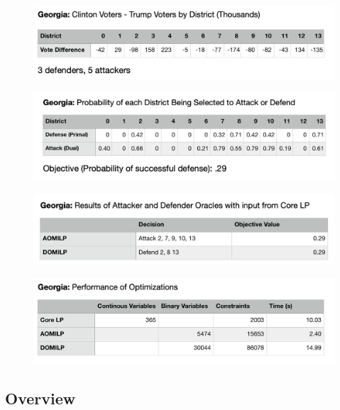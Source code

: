 \documentclass[letterpaper]{article} %
\begin{document}
\begin{figure}
    \includegraphics[width=\linewidth]{georgia_votes}
    \label{georgia_votes}
\end{figure}

\begin{figure}
    \includegraphics[width=\linewidth]{georgia_probs}
    \label{georgia_probs}
\end{figure}

\begin{figure}
    \includegraphics[width=\linewidth]{georgia_oracles}
    \label{georgia_oracles}
\end{figure}

\begin{figure}
    \includegraphics[width=\linewidth]{georgia_perfs}
    \label{georgia_perfs}
\end{figure}

\subsection{Overview}
\end{document}
